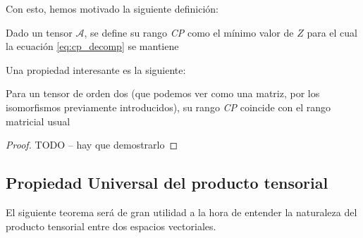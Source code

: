 Con esto, hemos motivado la siguiente definición:

\begin{definicion}
    Dado un tensor $\mathcal{A}$, se define su rango \textit{CP} como el mínimo valor de $Z$ para el cual la ecuación \eqref{eq:cp_decomp} se mantiene
\end{definicion}

Una propiedad interesante es la siguiente:

\begin{proposicion}[]
    Para un tensor de orden dos (que podemos ver como una matriz, por los isomorfismos previamente introducidos), su rango \textit{CP} coincide con el rango matricial usual
\end{proposicion}

\begin{proof}

TODO -- hay que demostrarlo

\end{proof}

\subsection{Propiedad Universal del producto tensorial}

El siguiente teorema será de gran utilidad a la hora de entender la naturaleza del producto tensorial entre dos espacios vectoriales.

